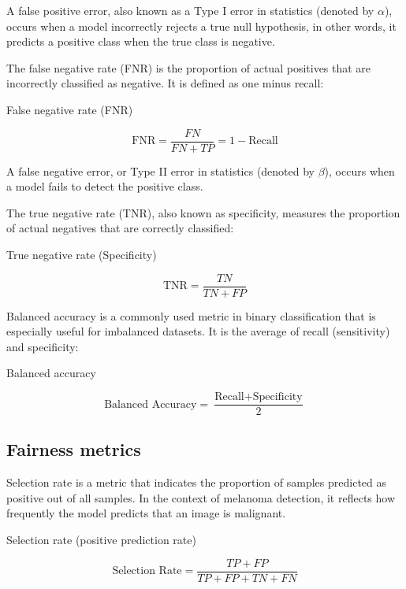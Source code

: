 A false positive error, also known as a Type I error in statistics (denoted by $\alpha$), occurs when a model incorrectly rejects a true null hypothesis, in other words, it predicts a positive class when the true class is negative.

The false negative rate (FNR) is the proportion of actual positives that are incorrectly classified as negative. It is defined as one minus recall:

\begin{myequation}[h!]
\caption{False negative rate (FNR)}
\label{eq:fnr}
\[
\text{FNR} = \frac{FN}{FN + TP} = 1 - \text{Recall}
\]
\end{myequation}

A false negative error, or Type II error in statistics (denoted by $\beta$), occurs when a model fails to detect the positive class.

The true negative rate (TNR), also known as specificity, measures the proportion of actual negatives that are correctly classified:

\begin{myequation}[h!]
\caption{True negative rate (Specificity)}
\label{eq:tnr}
\[
\text{TNR} = \frac{TN}{TN + FP}
\]
\end{myequation}

Balanced accuracy is a commonly used metric in binary classification that is especially useful for imbalanced datasets. It is the average of recall (sensitivity) and specificity:

\begin{myequation}[h!]
\caption{Balanced accuracy}
\label{eq:balanced_accuracy}
\[
\text{Balanced Accuracy} = \frac{\text{Recall} + \text{Specificity}}{2}
\]
\end{myequation}


\subsection{Fairness metrics}

Selection rate is a metric that indicates the proportion of samples predicted as positive out of all samples. In the context of melanoma detection, it reflects how frequently the model predicts that an image is malignant.

\begin{myequation}
\caption{Selection rate (positive prediction rate)}
\label{eq:selection_rate}
\[
\text{Selection Rate} = \frac{TP + FP}{TP + FP + TN + FN} 
\]
\end{myequation}

